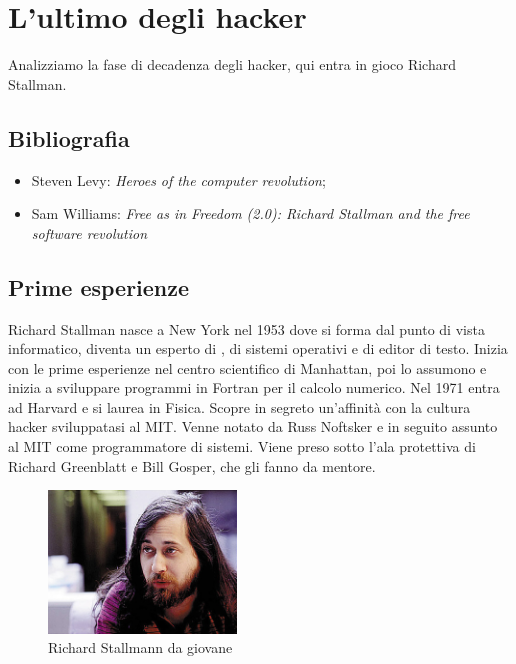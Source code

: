 \section{L'ultimo degli hacker}

Analizziamo la fase di decadenza degli hacker, qui entra in gioco Richard Stallman.

\subsection{Bibliografia}

\begin{itemize}

\item Steven Levy: \textit{Heroes of the computer revolution};
\item Sam Williams: \textit{Free as in Freedom (2.0): Richard Stallman and the free software revolution}

\end{itemize}

\subsection{Prime esperienze}

Richard Stallman nasce a New York nel 1953 dove si forma dal punto di vista informatico, diventa un esperto di , di sistemi operativi e di editor di testo. Inizia con le prime esperienze nel centro scientifico di Manhattan, poi lo assumono e inizia a sviluppare programmi in Fortran per il calcolo numerico. Nel 1971 entra ad Harvard e si laurea in Fisica. Scopre in segreto un'affinità con la cultura hacker sviluppatasi al MIT. Venne notato da Russ Noftsker e in seguito assunto al MIT come programmatore di sistemi. Viene preso sotto l'ala protettiva di Richard Greenblatt e Bill Gosper, che gli fanno da mentore.

\begin{figure}[htbp]
\centering
\includegraphics[width=50mm]{images/stallman.jpg}
\caption{Richard Stallmann da giovane}
\end{figure}

